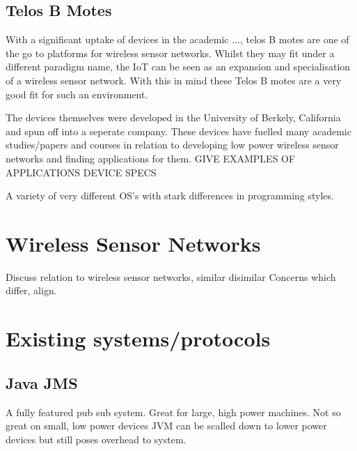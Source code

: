 \documentclass{l4proj}
\begin{document}
\subsection{Telos B Motes} %
\label{sub:telos_b_motes}

With a significant uptake of devices in the academic ..., telos B motes are one of the go to platforms for wireless sensor networks.
Whilst they may fit under a different paradigm name, the IoT can be seen as an expansion and specialisation of a wireless sensor network.
With this in mind these Telos B motes are a very good fit for such an environment. 

The devices themselves were developed in the University of Berkely, California and spun off into a seperate company. These devices have fuelled many academic studies/papers and courses in relation to developing low power wireless sensor networks and finding applications for them.
GIVE EXAMPLES OF APPLICATIONS
DEVICE SPECS

A variety of very different OS's with stark differences in programming styles.

\begin{comment}

Some research 
popular academic tool, many OS's, very low power like Arduino, with radio and sensors
some gpio, but limited
Contiki c like, event and thread driven
\end{comment}
\section{Wireless Sensor Networks} %
\label{sec:wireless_sensor_networks}
Discuss relation to wireless sensor networks, similar disimilar
Concerns which differ, align.


\section{Existing systems/protocols} %
\label{sec:existing_systems_protocols}

\subsection{Java JMS} %
\label{sub:java_jms}
A fully featured pub sub system.
Great for large, high power machines.
Not so great on small, low power devices
JVM can be scalled down to lower power devices but still poses overhead to system.
\end{document}
